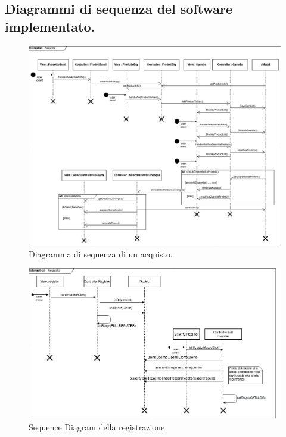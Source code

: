 \documentclass{article}
\begin{document}
\clearpage
\subsection{Diagrammi di sequenza del software implementato.}
\begin{figure}[h!]
	\centering
	\includegraphics[width=\textwidth]{SDAcquisto.jpg}
	\caption{Diagramma di sequenza di un acquisto.}
	\label{SDAcquisto.jpg}
	\newpage
\end{figure}
\begin{figure}[h!]
	\centering
	\includegraphics[width=\textwidth]{SequenceDiagramRegistrazione.jpg}
	\caption{Sequence Diagram della registrazione.}
	\label{fig:SequenceDiagramRegistrazione}
\end{figure}
\end{document}

